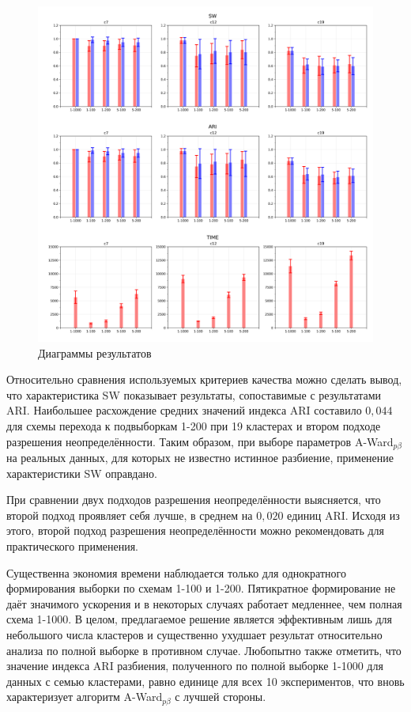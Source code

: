 \documentclass[12pt]{a&t}
\begin{document}
\begin{figure}[!h]
	\begin{center}
		\includegraphics[width=\textwidth]{imgs/bars.png} 
	\end{center}
	\caption{Диаграммы результатов}
	\label{fig:plots}
\end{figure}

Относительно сравнения используемых критериев качества можно сделать вывод, что характеристика SW показывает результаты, сопоставимые с результатами ARI. Наибольшее расхождение средних значений индекса ARI составило $ 0,044 $ для схемы перехода к подвыборкам 1-200 при 19 кластерах и втором подходе разрешения неопределённости. Таким образом, при выборе параметров \mbox{A-Ward$ _{p\beta} $} на реальных данных, для которых не известно истинное разбиение, применение характеристики SW оправдано.

При сравнении двух подходов разрешения неопределённости выясняется, что второй подход проявляет себя лучше, в среднем на $ 0,020 $ единиц ARI. Исходя из этого, второй подход разрешения неопределённости можно рекомендовать для практического применения.

Существенна экономия времени наблюдается только для однократного формирования выборки по схемам 1-100 и 1-200. Пятикратное формирование не даёт значимого ускорения и в некоторых случаях работает медленнее, чем полная схема 1-1000. В целом,  предлагаемое решение является эффективным лишь для небольшого числа кластеров и существенно ухудшает результат относительно анализа по полной выборке в противном случае. Любопытно также отметить, что значение индекса ARI разбиения, полученного по полной выборке 1-1000 для данных с семью кластерами, равно единице для всех 10 экспериментов, что вновь характеризует алгоритм \mbox{A-Ward$ _{p\beta} $} с лучшей стороны.
\end{document}
